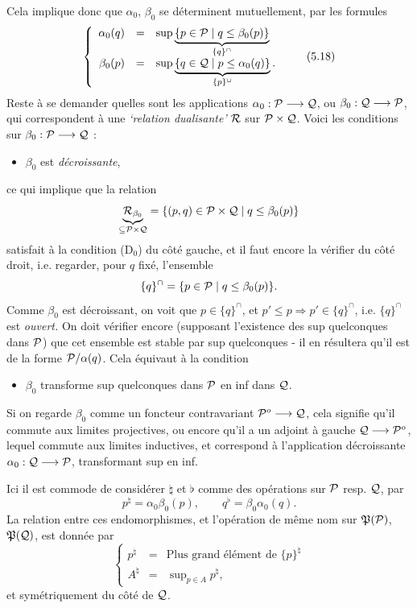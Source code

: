 Cela implique donc que $\alpha_0$, $\beta_0$ se déterminent mutuellement, par les formules
\[
\left\{
\begin{array}{rcl}
\alpha_0(q) & = & \sup \underbrace{\{p \in \mathcal{P} \mid q \leq \beta_0(p)\}}_{\{q\}^{\cap}}\\[3ex]
\beta_0(p) & = & \sup \underbrace{\{q \in \mathcal{Q} \mid p \leq \alpha_0(q)\}}_{\{p\}^{\cup}}.
\end{array}
\right.
\tag*{(5.18)}
\]
Reste à se demander quelles sont les applications $\alpha_0 : \mathcal{P} \longrightarrow \mathcal{Q}$, ou $\beta_0 : \mathcal{Q} \longrightarrow \mathcal{P}$, qui correspondent à une \textit{`relation dualisante'} %
$\mathcal{R}$ sur $\mathcal{P} \times \mathcal{Q}$. Voici les conditions sur $\beta_0 : \mathcal{P} \longrightarrow \mathcal{Q}$ :
\begin{itemize}[leftmargin=4em, labelsep=0.8em]
\item[\circled{a}] $\beta_0$ est \textit{décroissante},
\end{itemize}
ce qui implique que la relation
\[
\underbrace{\mathcal{R}_{\beta_0}}_{\subseteq \mathcal{P} \times \mathcal{Q}} = \{(p,q) \in \mathcal{P} \times \mathcal{Q} \mid q \leq \beta_0(p)\}
\]
satisfait à la condition (D$_0$) du côté gauche, et il faut encore la vérifier du côté droit, i.e. regarder, pour $q$ fixé, l'ensemble
\[
\{q\}^{\cap} = \{p \in \mathcal{P} \mid q \leq \beta_0(p)\}.
\]
Comme $\beta_0$ est décroissant, on voit que $p \in \{q\}^{\cap}$, et $p' \leq p \Longrightarrow p' \in \{q\}^{\cap}$, i.e. $\{q\}^{\cap}$ est \textit{ouvert.} On doit vérifier encore (supposant l'existence des sup quelconques dans $\mathcal{P}$) que cet ensemble est stable par sup quelconques - il en résultera qu'il est de la forme $\mathcal{P}/\alpha(q)$. Cela équivaut à la condition
\begin{itemize}[leftmargin=4em, labelsep=0.8em]
\item[\circled{b}] $\beta_0$ transforme sup quelconques dans $\mathcal{P}$ en inf dans $\mathcal{Q}$.
\end{itemize}
Si on regarde $\beta_0$ comme un foncteur contravariant $\mathcal{P}^{o} \longrightarrow \mathcal{Q}$, cela signifie qu'il commute aux limites projectives, ou encore qu'il a un adjoint à gauche $\mathcal{Q} \longrightarrow \mathcal{P}^{o}$, lequel commute aux limites inductives, et correspond
à l'application décroissante $\alpha_0 : \mathcal{Q} \longrightarrow \mathcal{P}$, transformant sup en inf.

Ici il est commode de considérer $\natural$ et $\flat$ comme des opérations sur $\mathcal{P}$ resp. $\mathcal{Q}$, par
\[
p^{\natural} = \alpha_0\beta_0(p), \qquad q^{\flat} = \beta_0\alpha_0(q).
\tag*{(5.19)}
\]
La relation entre ces endomorphismes, et l'opération de même nom sur $\mathfrak{P}(\mathcal{P})$, $\mathfrak{P}(\mathcal{Q})$, est donnée par
\[
\left\{
\begin{array}{rcl}
p^{\natural} & = & \text{Plus grand élément de } \{p\}^{\natural}\\[1ex]
A^{\natural} & = & \sup\nolimits_{p \in A} p^{\natural},
\end{array}
\right.
\tag*{(5.20)}
\]
et symétriquement du côté de $\mathcal{Q}$.

